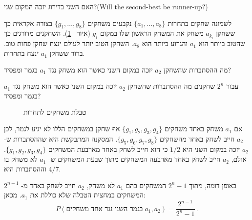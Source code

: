 \begin{prob}{האם השני בדירוג יזכה המקום שני?}{}{(Will the second-best be runner-up?)}

לשמונה שחקים בתחרות 
$\{a_1,\ldots,a_8\}$
נקבעים משחקים 
$\{g_1,\ldots,g_8\}$
בצורה אקראית כך ששחקן
$a_{k_{i}}$
משחק את המשחק הראשון שלו במקום
$g_{i}$
(איור%
~\ref{f.tournament}).
השחקנים מדורגים כך שהטוב ביותר הוא 
$a_1$
והגרוע ביותר הוא 
$a_8$.
השחקן הטוב יותר לעולם ינצח שחקן פחות טוב. ברור ששחקן
$a_1$
ינצח בתחרות.

מה ההסתברות שהשחקן
$a_2$
יזכה במקום השני כאשר הוא משחק נגד 
$a_1$
בגמר ומפסיד?

עבור
$2^n$
שחקנים מה ההסתברות שהשחקן
$a_2$
יזכה במקום השני כאשר הוא משחק נגד 
$a_1$
בגמר ומפסיד?
\begin{figure}[tb]
\begin{center}
\end{center}
\caption{טבלת משחקים לתחרות}\label{f.tournament}
\end{figure}
\end{prob}

\newpage

\solution{}

אם 
$a_1$
משחק באחד משחקים
$\{g_1,g_2,g_3,g_4\}$
אף שחקן במשחקים הללו לא יגיע לגמר, לכן 
$a_2$
חייב לשחק באחד מהשחקים
$\{g_5,g_6,g_7,g_8\}$.
המסקנה המתבקשת היא שההסתברות ש-%
$a_2$
יזכה במקום השני היא
$1/2$
כי הוא חייב לשחק באחד מארבעת המשחקים
$\{g_1,g_2,g_3,g_4\}$.
אולם, 
$a_2$
חייב לשחק באחד מארבעה המשחקים מתוך שבעת המשחקים ש-%
$a_1$
לא משחק בו וההסתברות היא
$4/7$.

באופן דומה, מתוך
$2^n-1$
המשחקים בהם 
$a_1$
לא משחק, 
$a_2$
חייב לשחק באחד מ-%
$2^{n-1}$
המשחקים במחצית הטבלה שלא כוללת את
$a_1$.
מכאן:
\[
P(\textrm{בגמר השני נגד אחד משחקים} \; a_1,a_2)=\frac{2^{n-1}}{2^n-1}\,.
\]

